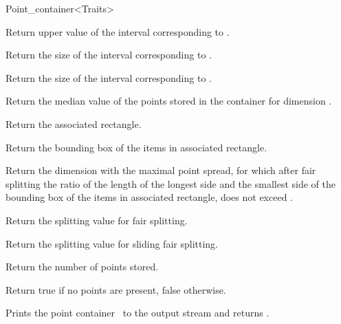 \begin{ccRefClass}{Point_container<Traits>}
\begin{ccAdvanced}
{
Return upper value of the interval corresponding to
.
}

{
Return the size of the interval corresponding to .
}

{
Return the size of the interval corresponding to .
}

{
Return the median value of the points stored in the container for
dimension .
}

{Return the associated rectangle.}

{Return the bounding box of the items in associated rectangle.}

{Return the dimension with the maximal point spread, for which after fair splitting
the ratio of the length of the longest side and the smallest side of the bounding box of
the items in associated rectangle,
does not exceed .}

{Return the splitting value for fair splitting.}

{Return the splitting value for sliding fair splitting.}

{
Return the number of points stored.
}

{
Return true if no points are present, false otherwise.
}





{Prints the point container \ccVar\ to the output stream  and returns .}


\ccSeeAlso

\\

\end{ccAdvanced}
\end{ccRefClass}


